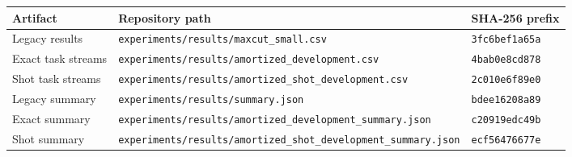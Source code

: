 \begin{tabular}{lll}
\toprule
Artifact & Repository path & SHA-256 prefix \\
\midrule
Legacy results & \texttt{experiments/results/maxcut\_small.csv} & \texttt{3fc6bef1a65a} \\
Exact task streams & \texttt{experiments/results/amortized\_development.csv} & \texttt{4bab0e8cd878} \\
Shot task streams & \texttt{experiments/results/amortized\_shot\_development.csv} & \texttt{2c010e6f89e0} \\
Legacy summary & \texttt{experiments/results/summary.json} & \texttt{bdee16208a89} \\
Exact summary & \texttt{experiments/results/amortized\_development\_summary.json} & \texttt{c20919edc49b} \\
Shot summary & \texttt{experiments/results/amortized\_shot\_development\_summary.json} & \texttt{ecf56476677e} \\
\bottomrule
\end{tabular}
